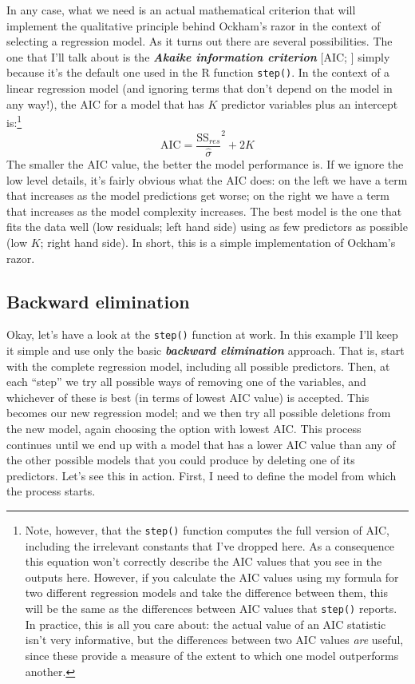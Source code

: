 \documentclass[
]{book}
\begin{document}
In any case, what we need is an actual mathematical criterion that will implement the qualitative principle behind Ockham's razor in the context of selecting a regression model. As it turns out there are several possibilities. The one that I'll talk about is the \textbf{\emph{Akaike information criterion}} {[}AIC; \citet{Akaike1974}{]} simply because it's the default one used in the R function \texttt{step()}. In the context of a linear regression model (and ignoring terms that don't depend on the model in any way!), the AIC for a model that has \(K\) predictor variables plus an intercept is:\footnote{Note, however, that the \texttt{step()} function computes the full version of AIC, including the irrelevant constants that I've dropped here. As a consequence this equation won't correctly describe the AIC values that you see in the outputs here. However, if you calculate the AIC values using my formula for two different regression models and take the difference between them, this will be the same as the differences between AIC values that \texttt{step()} reports. In practice, this is all you care about: the actual value of an AIC statistic isn't very informative, but the differences between two AIC values \emph{are} useful, since these provide a measure of the extent to which one model outperforms another.}
\[
\mbox{AIC} = \displaystyle\frac{\mbox{SS}_{res}}{\hat{\sigma}}^2+ 2K
\]
The smaller the AIC value, the better the model performance is. If we ignore the low level details, it's fairly obvious what the AIC does: on the left we have a term that increases as the model predictions get worse; on the right we have a term that increases as the model complexity increases. The best model is the one that fits the data well (low residuals; left hand side) using as few predictors as possible (low \(K\); right hand side). In short, this is a simple implementation of Ockham's razor.

\hypertarget{backward-elimination}{%
\subsection{Backward elimination}\label{backward-elimination}}

Okay, let's have a look at the \texttt{step()} function at work. In this example I'll keep it simple and use only the basic \textbf{\emph{backward elimination}} approach. That is, start with the complete regression model, including all possible predictors. Then, at each ``step'' we try all possible ways of removing one of the variables, and whichever of these is best (in terms of lowest AIC value) is accepted. This becomes our new regression model; and we then try all possible deletions from the new model, again choosing the option with lowest AIC. This process continues until we end up with a model that has a lower AIC value than any of the other possible models that you could produce by deleting one of its predictors. Let's see this in action. First, I need to define the model from which the process starts.
\end{document}
